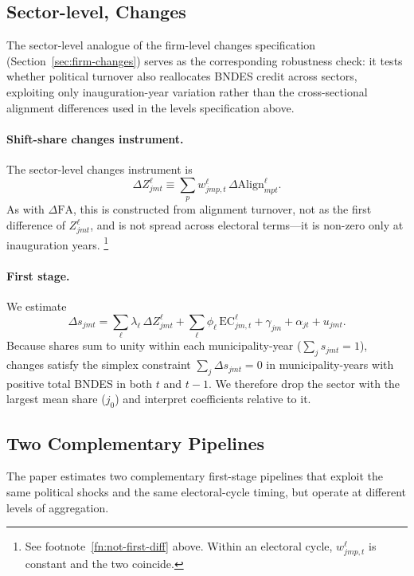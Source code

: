 \documentclass{article}
\newcommand{\Align}{\mathrm{Align}}
\newcommand{\FA}{\mathrm{FA}}
\newcommand{\EC}{\mathrm{EC}}
\begin{document}
\subsection{Sector-level, Changes}

The sector-level analogue of the firm-level changes specification
(Section~\ref{sec:firm-changes}) serves as the corresponding robustness check:
it tests whether political turnover also reallocates BNDES credit across
sectors, exploiting only inauguration-year variation rather than the
cross-sectional alignment differences used in the levels specification above.

\paragraph{Shift-share changes instrument.}
The sector-level changes instrument is
\[
  \Delta Z^{\ell}_{jmt} \equiv \sum_{p} w^\ell_{jmp,t}\,\Delta\Align^{\ell}_{mpt}.
\]
As with $\Delta\FA$,
this is constructed from alignment turnover, not as the first difference of $Z^{\ell}_{jmt}$,
and is not spread across electoral terms---it is non-zero only at inauguration years.%
\footnote{See footnote~\ref{fn:not-first-diff} above.
Within an electoral cycle, $w^\ell_{jmp,t}$ is constant and the two coincide.}

\paragraph{First stage.}
We estimate
\[
  \Delta s_{jmt} = \sum_{\ell} \lambda_{\ell}\,\Delta Z^{\ell}_{jmt}
  + \sum_{\ell} \phi_\ell\,\EC^\ell_{jm,t} + \gamma_{jm} + \alpha_{jt} + u_{jmt}.
\]
Because shares sum to unity within each municipality-year
($\sum_j s_{jmt} = 1$), changes satisfy the simplex constraint
$\sum_j \Delta s_{jmt} = 0$ in municipality-years with positive total BNDES
in both $t$ and $t-1$.
We therefore drop the sector with the largest mean share ($j_0$)
and interpret coefficients relative to it.

\subsection{Two Complementary Pipelines}

The paper estimates two complementary first-stage pipelines that exploit the
same political shocks and the same electoral-cycle timing, but operate at
different levels of aggregation.
\end{document}
